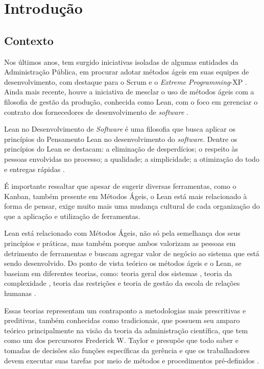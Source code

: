 

\chapter[Introdução]{Introdução}



\section[Contexto]{Contexto}

Nos últimos anos, tem surgido iniciativas isoladas de algumas entidades da Administração Pública, em procurar adotar métodos ágeis em suas equipes de desenvolvimento, com destaque para o Scrum e o \textit{Extreme Programming}-XP \cite{TCU:2013} \cite{RTMAC}.  Ainda mais recente, houve a iniciativa de mesclar o uso de métodos ágeis com a filosofia de gestão da produção, conhecida como Lean, com o foco em gerenciar o contrato dos fornecedores de desenvolvimento de \textit{software} \cite{agilebrazil}. 

Lean no Desenvolvimento de \textit{Software} é uma filosofia que busca aplicar os princípios do Pensamento Lean no desenvolvimento do \textit{software}. Dentre os princípios do Lean se destacam: a eliminação de desperdícios; o respeito às pessoas envolvidas no processo; a qualidade; a simplicidade; a otimização do todo e entregas rápidas \cite{poppendieck}.

É importante ressaltar que apesar de sugerir diversas ferramentas, como o Kanban, também presente em Métodos Ágeis, o Lean está mais relacionado à forma de pensar, exige muito mais uma mudança cultural de cada organização do que a aplicação e utilização de ferramentas. 

Lean está relacionado com Métodos Ágeis, não só pela semelhança dos seus princípios e práticas, mas também porque ambos valorizam as pessoas em detrimento de ferramentas e buscam agregar valor de negócio ao sistema que está sendo desenvolvido. Do ponto de vista teórico os métodos ágeis e o Lean, se baseiam em diferentes teorias, como: teoria geral dos sistemas \cite{sistemas}, teoria da complexidade \cite{complexidade}, teoria das restrições \cite{katayama2010} e teoria de gestão da escola de relações humanas \cite{administracao}. 

Essas teorias representam um contraponto a metodologias mais prescritivas e preditivas, também conhecidas como tradicionais, que possuem seu amparo teórico principalmente na visão da teoria da administração científica, que tem como um dos percursores Frederick W. Taylor e presupõe que todo saber e tomadas de decisões são funções específicas da gerência e que os trabalhadores devem executar suas tarefas por meio de métodos e procedimentos pré-definidos \cite{administracao}.


